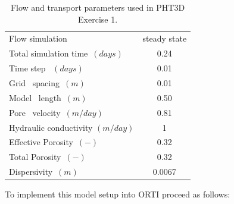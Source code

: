\begin{table}[b]
\caption{Flow and transport parameters used in PHT3D Exercise 1.}
\begin{center}
\begin{tabular}{lc}
\toprule
 Flow simulation                      &  steady state   \\
 Total simulation time\  $(days)$     &  0.24        \\
 Time step \  $(days)$                         &  0.01           \\
 Grid \ spacing\ $(m)       $         &  0.01           \\
 Model \  length\ $(m)      $         &  0.50           \\
 Pore  \ velocity\ $(m/day) $         &  0.81           \\
 Hydraulic conductivity $(m/day) $    &   1             \\
 Effective Porosity\ $(-)$            &  0.32           \\
 Total Porosity\  $(-)$               &  0.32           \\
 Dispersivity\ $(m)         $         &  0.0067         \\ 
 \bottomrule
\end{tabular}
\label{ex2_flow}
\end{center}
\end{table}

To implement this model setup into ORTI proceed as follows:

